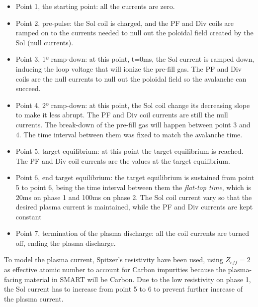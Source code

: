 \documentclass[a4paper,12pt,oneside]{book}
\begin{document}
\begin{itemize}
	\item Point 1, the starting point: all the currents are zero.
	\item Point 2, pre-pulse: the Sol coil is charged, and the PF and Div coils are ramped on to the currents needed to null out the poloidal field created by the Sol (null currents).
	\item Point 3, 1º ramp-down: at this point, t=0ms, the Sol current is ramped down, inducing the loop voltage that will ionize the pre-fill gas. The PF and Div coils are the null currents to null out the poloidal field so the avalanche can succeed.
	\item Point 4, 2º ramp-down: at this point, the Sol coil change its decreasing slope to make it less abrupt. The PF and Div coil currents are still the null currents. The break-down of the pre-fill gas will happen between point 3 and 4. The time interval between them was fixed to match the avalanche time.
	\item Point 5, target equilibrium: at this point the target equilibrium is reached. The PF and Div coil currents are the values at the target equilibrium.
	\item Point 6, end target equilibrium: the target equilibrium is sustained from point 5 to point 6, being the time interval between them the \textit{flat-top time}, which is 20ms on phase 1 and 100ms on phase 2.  The Sol coil current vary so that the desired plasma current is maintained, while the PF and Div currents are kept constant
	\item Point 7, termination of the plasma discharge: all the coil currents are turned off, ending the plasma discharge.

\end{itemize}

To model the plasma current, Spitzer's resistivity have been used, using $Z_{eff}=2$ as effective atomic number to account for Carbon impurities because the plasma-facing material in SMART will be Carbon. Due to the low resistivity on phase 1, the Sol current has to increase from point 5 to 6 to prevent further increase of the plasma current.
\end{document}
